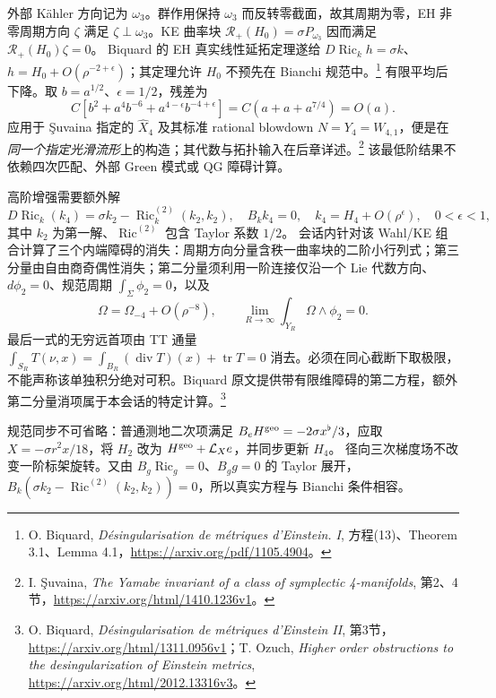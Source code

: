 \documentclass[UTF8,fontset=fandol,zihao=-4,oneside,openany]{ctexbook}
\theoremstyle{cjkplain}
\numberwithin{equation}{chapter}
\DeclareMathOperator{\Ric}{Ric}
\DeclareMathOperator{\tr}{tr}
\begin{document}
外部 Kähler 方向记为 \(\omega_3\)。群作用保持 \(\omega_3\) 而反转零截面，故其周期为零，EH 非零周期方向 \(\zeta\) 满足 \(\zeta\perp\omega_3\)。KE 曲率块
\(\mathcal R_+(H_0)=\sigma P_{\omega_3}\) 因而满足
\(\mathcal R_+(H_0)\zeta=0\)。
Biquard 的 EH 真实线性延拓定理遂给
\(D\Ric_kh=\sigma k\)、
\(h=H_0+O(\rho^{-2+\epsilon})\)；其定理允许 \(H_0\) 不预先在 Bianchi 规范中。\footnote{O. Biquard, \emph{Désingularisation de métriques d'Einstein. I}, 方程(13)、Theorem 3.1、Lemma 4.1，\url{https://arxiv.org/pdf/1105.4904}。}
有限平均后下降。取 \(b=a^{1/2}\)、\(\epsilon=1/2\)，残差为
\[
C\left[b^2+a^4b^{-6}+a^{4-\epsilon}b^{-4+\epsilon}\right]
=C(a+a+a^{7/4})=O(a).
\]
应用于 Şuvaina 指定的 \(\widehat X_4\) 及其标准 rational blowdown
\(N=Y_4=W_{4,1}\)，便是在\emph{同一个指定光滑流形}上的构造；其代数与拓扑输入在后章详述。\footnote{I. Şuvaina, \emph{The Yamabe invariant of a class of symplectic 4-manifolds}, 第2、4节，\url{https://arxiv.org/html/1410.1236v1}。}
该最低阶结果不依赖四次匹配、外部 Green 模式或 QG 障碍计算。

高阶增强需要额外解
\begin{equation}\label{FND:quarticequation}
D\Ric_k(k_4)=\sigma k_2-\Ric_k^{(2)}(k_2,k_2),\quad
B_kk_4=0,\quad k_4=H_4+O(\rho^\epsilon),\quad0<\epsilon<1,
\end{equation}
其中 \(k_2\) 为第一解、\(\Ric^{(2)}\) 包含 Taylor 系数 \(1/2\)。
会话内针对该 Wahl/KE 组合计算了三个内端障碍的消失：周期方向分量含秩一曲率块的二阶小行列式；第三分量由自由商奇偶性消失；第二分量须利用一阶连接仅沿一个 Lie 代数方向、\(d\phi_2=0\)、规范周期 \(\int_\Sigma\phi_2=0\)，以及
\[
\Omega=\Omega_{-4}+O(\rho^{-8}),\qquad
\lim_{R\to\infty}\int_{Y_R}\Omega\wedge\phi_2=0 .
\]
最后一式的无穷远首项由 TT 通量
\(\int_{S_R}T(\nu,x)=\int_{B_R}(\operatorname{div}T)(x)+\tr T=0\)
消去。必须在同心截断下取极限，不能声称该单独积分绝对可积。Biquard 原文提供带有限维障碍的第二方程，额外第二分量消项属于本会话的特定计算。\footnote{O. Biquard, \emph{Désingularisation de métriques d'Einstein II}, 第3节，\url{https://arxiv.org/html/1311.0956v1}；T. Ozuch, \emph{Higher order obstructions to the desingularization of Einstein metrics}, \url{https://arxiv.org/html/2012.13316v3}。}

规范同步不可省略：普通测地二次项满足
\(B_eH^{\rm geo}=-2\sigma x^\flat/3\)，应取
\(X=-\sigma r^2x/18\)，将 \(H_2\) 改为
\(H^{\rm geo}+\mathcal L_Xe\)，并同步更新 \(H_4\)。
径向三次梯度场不改变一阶标架旋转。又由
\(B_g\Ric_g=0\)、\(B_gg=0\) 的 Taylor 展开，
\(B_k(\sigma k_2-\Ric^{(2)}(k_2,k_2))=0\)，所以真实方程与 Bianchi 条件相容。
\end{document}
